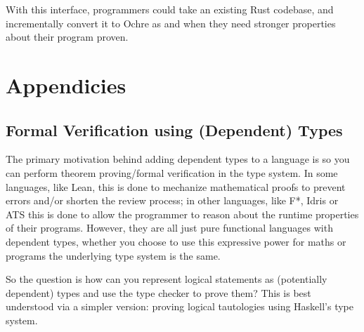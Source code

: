 \documentclass[12pt,twoside]{report}
\begin{document}
With this interface, programmers could take an existing Rust codebase, and incrementally convert it to Ochre as and when they need stronger properties about their program proven.






\appendix 
{}

\chapter{Appendicies}
\section{Formal Verification using (Dependent) Types}
\label{verificationwithtypes}

The primary motivation behind adding dependent types to a language is so you can perform theorem proving/formal verification in the type system. In some languages, like Lean, this is done to mechanize mathematical proofs to prevent errors and/or shorten the review process; in other languages, like F*, Idris or ATS this is done to allow the programmer to reason about the runtime properties of their programs. However, they are all just pure functional languages with dependent types, whether you choose to use this expressive power for maths or programs the underlying type system is the same.

So the question is how can you represent logical statements as (potentially dependent) types and use the type checker to prove them? This is best understood via a simpler version: proving logical tautologies using Haskell's type system.
\end{document}
